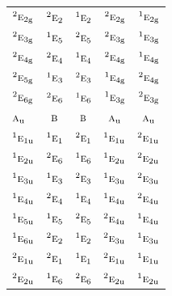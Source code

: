 \documentclass[10pt,a4paper]{article}
\numberwithin{equation}{section}
\newcommand{\irr}[1]{\text{\normalfont\scshape #1}}
\newcommand{\conjpair}[1]{{}^{#1}}
\newcommand{\ptag}[1]{\mathrm{#1}}
\begin{document}
{\begin{longtable}{@{}lcccc@{}}
$\conjpair{2}\irr{e}_{2\ptag{g}}$ & $\conjpair{2}\irr{e}_{2}$ & $\conjpair{1}\irr{e}_{2}$ & $\conjpair{2}\irr{e}_{2\ptag{g}}$ & $\conjpair{1}\irr{e}_{2\ptag{g}}$\\
$\conjpair{2}\irr{e}_{3\ptag{g}}$ & $\conjpair{1}\irr{e}_{5}$ & $\conjpair{2}\irr{e}_{5}$ & $\conjpair{2}\irr{e}_{3\ptag{g}}$ & $\conjpair{1}\irr{e}_{3\ptag{g}}$\\
$\conjpair{2}\irr{e}_{4\ptag{g}}$ & $\conjpair{2}\irr{e}_{4}$ & $\conjpair{1}\irr{e}_{4}$ & $\conjpair{2}\irr{e}_{4\ptag{g}}$ & $\conjpair{1}\irr{e}_{4\ptag{g}}$\\
$\conjpair{2}\irr{e}_{5\ptag{g}}$ & $\conjpair{1}\irr{e}_{3}$ & $\conjpair{2}\irr{e}_{3}$ & $\conjpair{1}\irr{e}_{4\ptag{g}}$ & $\conjpair{2}\irr{e}_{4\ptag{g}}$\\
$\conjpair{2}\irr{e}_{6\ptag{g}}$ & $\conjpair{2}\irr{e}_{6}$ & $\conjpair{1}\irr{e}_{6}$ & $\conjpair{1}\irr{e}_{3\ptag{g}}$ & $\conjpair{2}\irr{e}_{3\ptag{g}}$\\
$\irr{a}_{\ptag{u}}$ & $\irr{b}$ & $\irr{b}$ & $\irr{a}_{\ptag{u}}$ & $\irr{a}_{\ptag{u}}$\\
$\conjpair{1}\irr{e}_{1\ptag{u}}$ & $\conjpair{1}\irr{e}_{1}$ & $\conjpair{2}\irr{e}_{1}$ & $\conjpair{1}\irr{e}_{1\ptag{u}}$ & $\conjpair{2}\irr{e}_{1\ptag{u}}$\\
$\conjpair{1}\irr{e}_{2\ptag{u}}$ & $\conjpair{2}\irr{e}_{6}$ & $\conjpair{1}\irr{e}_{6}$ & $\conjpair{1}\irr{e}_{2\ptag{u}}$ & $\conjpair{2}\irr{e}_{2\ptag{u}}$\\
$\conjpair{1}\irr{e}_{3\ptag{u}}$ & $\conjpair{1}\irr{e}_{3}$ & $\conjpair{2}\irr{e}_{3}$ & $\conjpair{1}\irr{e}_{3\ptag{u}}$ & $\conjpair{2}\irr{e}_{3\ptag{u}}$\\
$\conjpair{1}\irr{e}_{4\ptag{u}}$ & $\conjpair{2}\irr{e}_{4}$ & $\conjpair{1}\irr{e}_{4}$ & $\conjpair{1}\irr{e}_{4\ptag{u}}$ & $\conjpair{2}\irr{e}_{4\ptag{u}}$\\
$\conjpair{1}\irr{e}_{5\ptag{u}}$ & $\conjpair{1}\irr{e}_{5}$ & $\conjpair{2}\irr{e}_{5}$ & $\conjpair{2}\irr{e}_{4\ptag{u}}$ & $\conjpair{1}\irr{e}_{4\ptag{u}}$\\
$\conjpair{1}\irr{e}_{6\ptag{u}}$ & $\conjpair{2}\irr{e}_{2}$ & $\conjpair{1}\irr{e}_{2}$ & $\conjpair{2}\irr{e}_{3\ptag{u}}$ & $\conjpair{1}\irr{e}_{3\ptag{u}}$\\
$\conjpair{2}\irr{e}_{1\ptag{u}}$ & $\conjpair{2}\irr{e}_{1}$ & $\conjpair{1}\irr{e}_{1}$ & $\conjpair{2}\irr{e}_{1\ptag{u}}$ & $\conjpair{1}\irr{e}_{1\ptag{u}}$\\
$\conjpair{2}\irr{e}_{2\ptag{u}}$ & $\conjpair{1}\irr{e}_{6}$ & $\conjpair{2}\irr{e}_{6}$ & $\conjpair{2}\irr{e}_{2\ptag{u}}$ & $\conjpair{1}\irr{e}_{2\ptag{u}}$\\

\end{longtable}}
\end{document}
